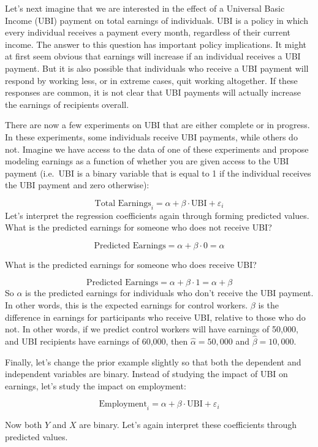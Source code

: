 \documentclass[
]{book}
\begin{document}
Let's next imagine that we are interested in the effect of a Universal Basic Income (UBI) payment on total earnings of individuals. UBI is a policy in which every individual receives a payment every month, regardless of their current income. The answer to this question has important policy implications. It might at first seem obvious that earnings will increase if an individual receives a UBI payment. But it is also possible that individuals who receive a UBI payment will respond by working less, or in extreme cases, quit working altogether. If these responses are common, it is not clear that UBI payments will actually increase the earnings of recipients overall.

There are now a few experiments on UBI that are either complete or in progress. In these experiments, some individuals receive UBI payments, while others do not. Imagine we have access to the data of one of these experiments and propose modeling earnings as a function of whether you are given access to the UBI payment (i.e.~UBI is a binary variable that is equal to 1 if the individual receives the UBI payment and zero otherwise):

\[
\text{Total Earnings}_i = \alpha + \beta \cdot \text{UBI} + \varepsilon_i
\]
Let's interpret the regression coefficients again through forming predicted values. What is the predicted earnings for someone who does not receive UBI?

\[ 
\text{Predicted Earnings} = \alpha + \beta \cdot 0 =\alpha
\]

What is the predicted earnings for someone who does receive UBI?

\[ 
\text{Predicted Earnings} = \alpha + \beta \cdot 1 =\alpha + \beta
\]
So \(\alpha\) is the predicted earnings for individuals who don't receive the UBI payment. In other words, this is the expected earnings for control workers. \(\beta\) is the difference in earnings for participants who receive UBI, relative to those who do not. In other words, if we predict control workers will have earnings of 50,000, and UBI recipients have earnings of 60,000, then \(\hat{\alpha}=50,000\) and \(\hat{\beta}=10,000\).

Finally, let's change the prior example slightly so that both the dependent and independent variables are binary. Instead of studying the impact of UBI on earnings, let's study the impact on employment:

\[
\text{Employment}_i = \alpha + \beta \cdot \text{UBI} + \varepsilon_i
\]

Now both \(Y\) and \(X\) are binary. Let's again interpret these coefficients through predicted values.
\end{document}
